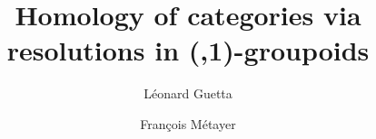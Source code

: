 \documentclass[11pt]{amsart}
\title{Homology of categories via resolutions in (\omega,1)-groupoids}
\author{Léonard Guetta}
\author{Fran\c{c}ois M\'etayer}
\begin{document}
\begin{abstract}
  
\end{abstract}

\maketitle









\end{document}
